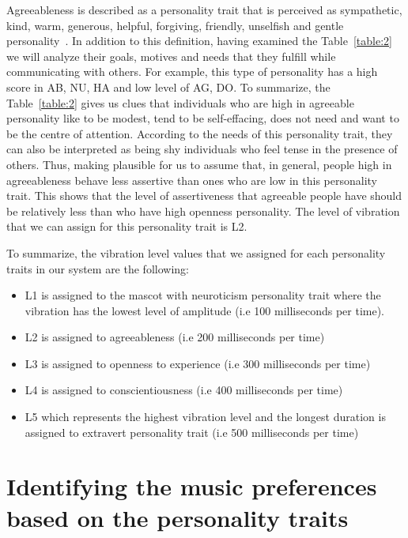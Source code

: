 Agreeableness is described as a personality trait that is perceived as sympathetic,
kind, warm, generous, helpful, forgiving, friendly, unselfish and gentle personality~\cite{matthews2003personality}.
In addition to this definition, having examined the Table~\ref{table:2} we will
analyze their goals, motives and needs that they fulfill while communicating with others.
For example, this type of personality has a high score in AB, NU, HA and low level
of AG, DO. To summarize, the Table~\ref{table:2} gives us clues that individuals who
are high in agreeable personality like to be modest, tend to be self-effacing,
does not need and want to be the centre of attention.
According to the needs of this personality trait, they can also be interpreted as
being shy individuals who feel tense in the presence of others.
Thus, making plausible for us to assume that, in general, people high in agreeableness
behave less assertive than ones who are low in this personality trait.
This shows that the level of assertiveness that agreeable people have should be
relatively less than who have high openness personality.
The level of vibration that we can assign for this personality trait is L2.

To summarize, the vibration level values that we assigned for each personality traits in our system are the following:
\begin{itemize}
\item L1 is assigned to the mascot with neuroticism personality trait where the
      vibration has the lowest level of amplitude (i.e 100 milliseconds per time).
\item L2 is assigned to agreeableness (i.e 200 milliseconds per time)
\item L3 is assigned to openness to experience (i.e 300 milliseconds per time)
\item L4 is assigned to conscientiousness (i.e 400 milliseconds per time)
\item L5 which represents the highest vibration level and the longest duration
      is assigned to extravert personality trait (i.e 500 milliseconds per time)
\end{itemize}



\section{Identifying the music preferences based on the personality traits}
\label{sec:Identifying the music preferences based on the personality traits}


